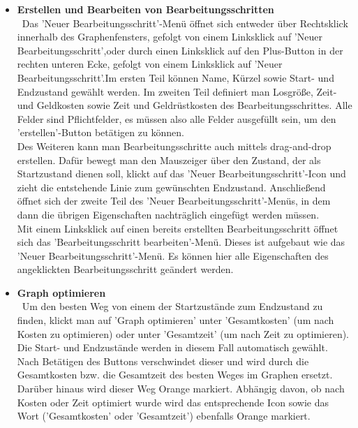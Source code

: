 \documentclass[twoside]{report}
\begin{document}
\begin{itemize}
  \item \textbf{ Erstellen und Bearbeiten von Bearbeitungsschritten }
    \\\
      Das 'Neuer Bearbeitungsschritt'-Menü öffnet sich entweder über Rechtsklick innerhalb des Graphenfensters, gefolgt von einem Linksklick auf 'Neuer Bearbeitungsschritt',oder durch einen Linksklick auf den Plus-Button in der rechten unteren Ecke, gefolgt von einem Linksklick auf 'Neuer Bearbeitungsschritt'.Im ersten Teil können Name, Kürzel sowie Start- und Endzustand gewählt werden. Im zweiten Teil definiert man Losgröße, Zeit- und Geldkosten sowie Zeit und Geldrüstkosten des Bearbeitungsschrittes. Alle Felder sind Pflichtfelder, es müssen also alle Felder ausgefüllt sein, um den 'erstellen'-Button betätigen zu können.\\
      Des Weiteren kann man Bearbeitungsschritte auch mittels drag-and-drop erstellen. Dafür bewegt man den Mauszeiger über den Zustand, der als Startzustand dienen soll, klickt auf das 'Neuer Bearbeitungsschritt'-Icon und zieht die entstehende Linie zum gewünschten Endzustand. Anschließend öffnet sich der zweite Teil des 'Neuer Bearbeitungsschritt'-Menüs, in dem dann die übrigen Eigenschaften  nachträglich eingefügt werden müssen.\\
      Mit einem Linksklick auf einen bereits erstellten Bearbeitungsschritt öffnet sich das 'Bearbeitungsschritt bearbeiten'-Menü. Dieses ist aufgebaut wie das 'Neuer Bearbeitungsschritt'-Menü. Es können hier alle Eigenschaften des angeklickten Bearbeitungsschritt geändert werden.
  \item \textbf{ Graph optimieren }
    \\\
      Um den besten Weg von einem der Startzustände zum Endzustand zu finden, klickt man auf 'Graph optimieren' unter 'Gesamtkosten' (um nach Kosten zu optimieren) oder unter 'Gesamtzeit' (um nach Zeit zu optimieren). Die Start- und Endzustände werden in diesem Fall automatisch gewählt. Nach Betätigen des Buttons verschwindet dieser und wird durch die Gesamtkosten bzw. die Gesamtzeit des besten Weges im Graphen ersetzt. Darüber hinaus wird dieser Weg Orange markiert. Abhängig davon, ob nach Kosten oder Zeit optimiert wurde wird das entsprechende Icon sowie das Wort ('Gesamtkosten' oder 'Gesamtzeit') ebenfalls Orange markiert.\\

\end{itemize}
\end{document}
